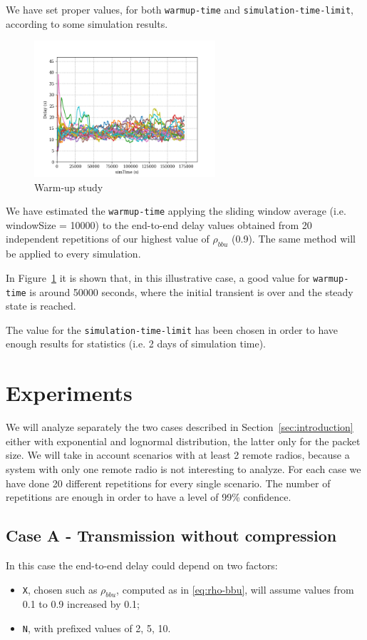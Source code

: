 \documentclass[11pt,a4paper,oneside, openright]{article}
\begin{document}
We have set proper values, for both \texttt{warmup-time} and \texttt{simulation-time-limit}, according to some simulation results.
\begin{figure}[h]
	\centering
	\includegraphics[width=0.6\textwidth]{images/warm-up}
	\caption{Warm-up study}
	\label{fig:warm-up-study}
\end{figure}

We have estimated the \texttt{warmup-time} applying the sliding window average (i.e. windowSize = 10000) to the end-to-end delay values obtained from 20 independent repetitions of our highest value of $ \rho_{bbu} $ (0.9). The same method will be applied to every simulation.

In Figure~\ref{fig:warm-up-study} it is shown that, in this illustrative case, a good value for \texttt{warmup-time} is around 50000 seconds, where the initial transient is over and the steady state is reached. 

The value for the \texttt{simulation-time-limit} has been chosen in order to have enough results for statistics (i.e. 2 days of simulation time).

\section{Experiments}
We will analyze separately the two cases described in Section~\ref{sec:introduction} either with exponential and lognormal distribution, the latter only for the packet size.
We will take in account scenarios with at least 2 remote radios, because a system with only one remote radio is not interesting to analyze. For each case we have done 20 different repetitions for every single scenario.
The number of repetitions are enough in order to have a level of 99\% confidence. 

\subsection{Case A - Transmission without compression}
In this case the end-to-end delay could depend on two factors:
\begin{itemize}
	\item \texttt{X}, chosen such as $ \rho_{bbu} $, computed as in \ref{eq:rho-bbu}, will assume values from 0.1 to 0.9 increased by 0.1;
	\item \texttt{N}, with prefixed values of 2, 5, 10.
\end{itemize}
\end{document}
